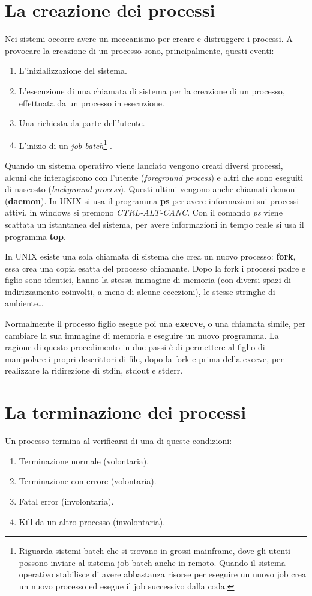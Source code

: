 \section{La creazione dei processi}
Nei sistemi occorre avere un meccanismo per creare e distruggere i processi.
A provocare la creazione di un processo sono, principalmente, questi eventi:
\begin{enumerate}
    \item L'inizializzazione del sistema.
    \item L'esecuzione di una chiamata di sistema per la creazione di un processo, effettuata da un processo in esecuzione.
    \item Una richiesta da parte dell'utente.
    \item L'inizio di un \textit{job batch}\footnote{ Riguarda sistemi batch che si trovano in grossi mainframe, dove gli utenti possono inviare al sistema job batch anche in remoto. Quando il sistema operativo stabilisce di avere abbastanza risorse per eseguire un nuovo job crea un nuovo processo ed esegue il job successivo dalla coda.} .
\end{enumerate}

Quando un sistema operativo viene lanciato vengono creati diversi processi, alcuni che interagiscono con l'utente (\textit{foreground process}) e altri che sono eseguiti di nascosto (\textit{background process}). Questi ultimi vengono anche chiamati demoni (\textbf{daemon}).
In UNIX si usa il programma \textbf{ps} per avere informazioni sui processi attivi, in windows si premono \textit{CTRL-ALT-CANC}.
Con il comando \textit{ps} viene scattata un istantanea del sistema, per avere informazioni in tempo reale si usa il programma \textbf{top}.

In UNIX esiste una sola chiamata di sistema che crea un nuovo processo: \textbf{fork}, essa crea una copia esatta del processo chiamante. Dopo la fork i processi padre e figlio sono identici, hanno la stessa immagine di memoria (con diversi spazi di indirizzamento coinvolti, a meno di alcune eccezioni), le stesse stringhe di ambiente\dots

Normalmente il processo figlio esegue poi una \textbf{execve}, o una chiamata simile, per cambiare la sua immagine di memoria e eseguire un nuovo programma.
La ragione di questo procedimento in due passi è di permettere al figlio di manipolare i propri descrittori di file, dopo la fork e prima della execve, per realizzare la ridirezione di stdin, stdout e stderr.

\section{La terminazione dei processi}
Un processo termina al verificarsi di una di queste condizioni:
\begin{enumerate}
    \item Terminazione normale (volontaria).
    \item Terminazione con errore (volontaria).
    \item Fatal error (involontaria).
    \item Kill da un altro processo (involontaria).
\end{enumerate}

